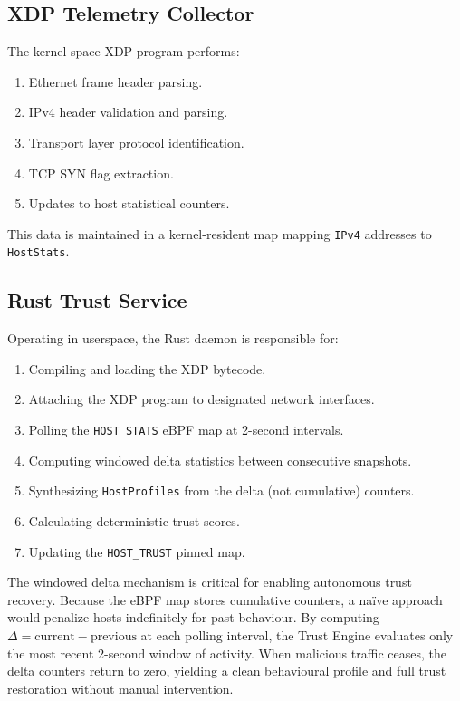 \documentclass[conference]{IEEEtran}
\begin{document}
\subsection{XDP Telemetry Collector}
The kernel-space XDP program performs:
\begin{enumerate}
\item Ethernet frame header parsing.
\item IPv4 header validation and parsing.
\item Transport layer protocol identification.
\item TCP SYN flag extraction.
\item Updates to host statistical counters.
\end{enumerate}
This data is maintained in a kernel-resident map mapping \texttt{IPv4} addresses to \texttt{HostStats}.

\subsection{Rust Trust Service}
Operating in userspace, the Rust daemon is responsible for:
\begin{enumerate}
\item Compiling and loading the XDP bytecode.
\item Attaching the XDP program to designated network interfaces.
\item Polling the \texttt{HOST\_STATS} eBPF map at 2-second intervals.
\item Computing windowed delta statistics between consecutive snapshots.
\item Synthesizing \texttt{HostProfiles} from the delta (not cumulative) counters.
\item Calculating deterministic trust scores.
\item Updating the \texttt{HOST\_TRUST} pinned map.
\end{enumerate}

The windowed delta mechanism is critical for enabling autonomous trust recovery. Because the eBPF map stores cumulative counters, a na\"ive approach would penalize hosts indefinitely for past behaviour. By computing $\Delta = \text{current} - \text{previous}$ at each polling interval, the Trust Engine evaluates only the most recent 2-second window of activity. When malicious traffic ceases, the delta counters return to zero, yielding a clean behavioural profile and full trust restoration without manual intervention.
\end{document}
